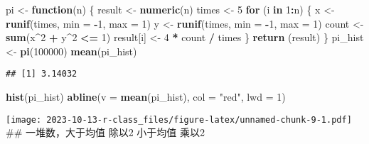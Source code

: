 \documentclass[
]{article}
\newenvironment{Shaded}{\begin{snugshade}}{\end{snugshade}}
\newcommand{\AttributeTok}[1]{\textcolor[rgb]{0.13,0.29,0.53}{#1}}
\newcommand{\ControlFlowTok}[1]{\textcolor[rgb]{0.13,0.29,0.53}{\textbf{#1}}}
\newcommand{\DecValTok}[1]{\textcolor[rgb]{0.00,0.00,0.81}{#1}}
\newcommand{\FunctionTok}[1]{\textcolor[rgb]{0.13,0.29,0.53}{\textbf{#1}}}
\newcommand{\NormalTok}[1]{#1}
\newcommand{\OtherTok}[1]{\textcolor[rgb]{0.56,0.35,0.01}{#1}}
\newcommand{\SpecialCharTok}[1]{\textcolor[rgb]{0.81,0.36,0.00}{\textbf{#1}}}
\newcommand{\StringTok}[1]{\textcolor[rgb]{0.31,0.60,0.02}{#1}}
\begin{document}
\begin{Shaded}
\begin{Highlighting}[]
\NormalTok{pi }\OtherTok{\textless{}{-}} \ControlFlowTok{function}\NormalTok{(n) \{}
\NormalTok{  result }\OtherTok{\textless{}{-}} \FunctionTok{numeric}\NormalTok{(n)}
\NormalTok{  times }\OtherTok{\textless{}{-}} \DecValTok{5}
  \ControlFlowTok{for}\NormalTok{ (i }\ControlFlowTok{in} \DecValTok{1}\SpecialCharTok{:}\NormalTok{n) \{}
\NormalTok{    x }\OtherTok{\textless{}{-}} \FunctionTok{runif}\NormalTok{(times, }\AttributeTok{min =} \SpecialCharTok{{-}}\DecValTok{1}\NormalTok{, }\AttributeTok{max =} \DecValTok{1}\NormalTok{)}
\NormalTok{    y }\OtherTok{\textless{}{-}} \FunctionTok{runif}\NormalTok{(times, }\AttributeTok{min =} \SpecialCharTok{{-}}\DecValTok{1}\NormalTok{, }\AttributeTok{max =} \DecValTok{1}\NormalTok{)}
\NormalTok{    count }\OtherTok{\textless{}{-}} \FunctionTok{sum}\NormalTok{(x}\SpecialCharTok{\^{}}\DecValTok{2} \SpecialCharTok{+}\NormalTok{ y}\SpecialCharTok{\^{}}\DecValTok{2} \SpecialCharTok{\textless{}=} \DecValTok{1}\NormalTok{)}
\NormalTok{    result[i] }\OtherTok{\textless{}{-}} \DecValTok{4} \SpecialCharTok{*}\NormalTok{ count }\SpecialCharTok{/}\NormalTok{ times}
\NormalTok{  \}}
  \FunctionTok{return}\NormalTok{ (result)}
\NormalTok{\}}
\NormalTok{pi\_hist }\OtherTok{\textless{}{-}} \FunctionTok{pi}\NormalTok{(}\DecValTok{100000}\NormalTok{)}
\FunctionTok{mean}\NormalTok{(pi\_hist)}
\end{Highlighting}
\end{Shaded}

\begin{verbatim}
## [1] 3.14032
\end{verbatim}

\begin{Shaded}
\begin{Highlighting}[]
\FunctionTok{hist}\NormalTok{(pi\_hist)}
\FunctionTok{abline}\NormalTok{(}\AttributeTok{v =} \FunctionTok{mean}\NormalTok{(pi\_hist), }\AttributeTok{col =} \StringTok{"red"}\NormalTok{, }\AttributeTok{lwd =} \DecValTok{1}\NormalTok{) }
\end{Highlighting}
\end{Shaded}

\texttt{[image: 2023-10-13-r-class\_files/figure-latex/unnamed-chunk-9-1.pdf]}
\#\# 一堆数，大于均值 除以2 小于均值 乘以2
\end{document}
